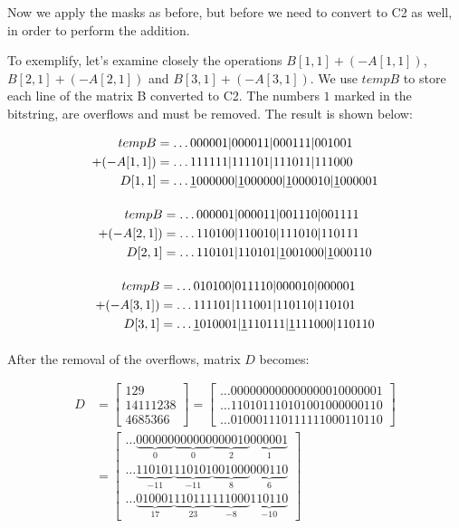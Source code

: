 \documentclass[12pt]{article}
\begin{document}
Now we apply the masks as before, but before we need to convert to C2 as well,
in order to perform the addition.

To exemplify, let's examine closely the operations $B[1,1] + (-A[1,1])$,
$B[2,1] + (-A[2,1])$ and $B[3,1] + (-A[3,1])$. We use $tempB$ to store each line
of the matrix B converted to C2. The numbers $1$ marked in the bitstring, are
overflows and must be removed. The result is shown below:

\begin{align*}
	tempB	&=\ldots000001|000011|000111|001001\\
    +(-A[1,1])	&=\ldots111111|111101|111011|111000\\
	D[1,1]
&=\ldots\sout{1}000000|\sout{1}000000|\sout{1}000010|\sout{1}000001
\end{align*}

\begin{align*}
	tempB 	&= \ldots000001|000011|001110|001111\\
      +(-A[2,1])&= \ldots110100|110010|111010|110111\\ 
      D[2,1]	&= \ldots110101|110101|\sout{1}001000|\sout{1}000110
\end{align*}

\begin{align*}
    tempB	&= \ldots010100|011110|000010|000001 \\
    +(-A[3,1])	&= \ldots111101|111001|110110|110101\\ 
    D[3,1]	&= \ldots\sout{1}010001|\sout{1}110111|\sout{1}111000|110110
\end{align*}

After the removal of the overflows, matrix $D$ becomes:

\begin{align}
	D &=\begin{bmatrix}
		129\\ 
		14111238\\ 
		4685366
	    \end{bmatrix} 
        =
        \begin{bmatrix}
	  \ldots000000000000000010000001 \\
	  \ldots110101110101001000000110 \\
	  \ldots010001110111111000110110
	\end{bmatrix}
	\\\nonumber
	&=\begin{bmatrix}
\ldots\underbrace{000000}_{0}\underbrace{000000}_{0}\underbrace{000010}_{2}
\underbrace{000001}_{1} \\ 			 
\ldots\underbrace{110101}_{-11}\underbrace{110101}_{-11}\underbrace{001000}_{8}
\underbrace{000110}_{6} \\
\ldots\underbrace{010001}_{17}\underbrace{110111}_{23}\underbrace{111000}_{-8}
\underbrace{110110}_{-10}
	  \end{bmatrix}
\end{align}
\end{document}
